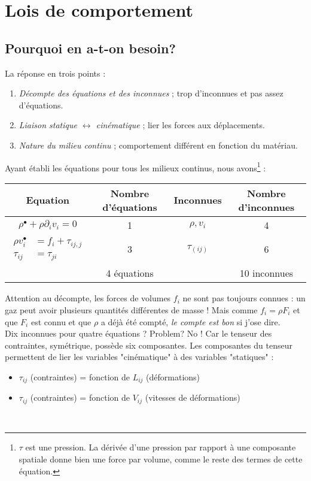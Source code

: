 \chapter{Lois de comportement}
\label{ch:ch5}

\section{Pourquoi en a-t-on besoin?}
La réponse en trois points :
\begin{enumerate}
\item \textit{Décompte des équations et des inconnues} ; trop d'inconnues et pas assez d'équations.
\item \textit{Liaison statique $\leftrightarrow$ cinématique} ; lier les forces aux déplacements.
\item \textit{Nature du milieu continu} ; comportement différent en fonction du matériau.
\end{enumerate}
Ayant établi les équations pour tous les milieux continus, nous avons\footnote{$\tau$ est une 
pression. La dérivée d'une pression par rapport à une composante spatiale donne bien une force par
volume, comme le reste des termes de cette équation.} :

\begin{center}
\begin{tabular}{|c|c|c|c|}
    \hline
    \textbf{Equation} & \textbf{Nombre d'équations} & \textbf{Inconnues}  & \textbf{Nombre 
    d'inconnues}\\
    \hline
    $\rho^\bullet + \rho\partial_i v_i = 0$ & 1 & $\rho,v_i$ & 4\\
    \hline
    $\begin{array}{ll}
    \rho v_i^\bullet &= f_i + \tau_{ij,j}\\
    \tau_{ij} &= \tau_{ji}
    \end{array}$ & 3 & $\tau_{(ij)}$ & 6\\
    \hline
     & 4 équations & & 10 inconnues\\
     \hline
\end{tabular}
\end{center}
Attention au décompte, les forces de volumes $f_i$ ne sont pas toujours connues : un gaz peut
avoir plusieurs quantités différentes de masse ! Mais comme $f_i = \rho F_i$ et que $F_i$ est
connu et que $\rho$ a déjà été compté, \textit{le compte est bon} si j'ose dire.\\

Dix inconnues pour quatre équations ? Problem? No ! Car le tenseur des contraintes, symétrique,
possède six composantes. Les composantes du tenseur permettent de lier les variables "cinématique" à des variables "statiques" :
\begin{itemize}
\item $\tau_{ij}$ (contraintes) = fonction de $L_{ij}$ (déformations)
\item $\tau_{ij}$ (contraintes) = fonction de $V_{ij}$ (vitesses de déformations)
\end{itemize}\ \\

